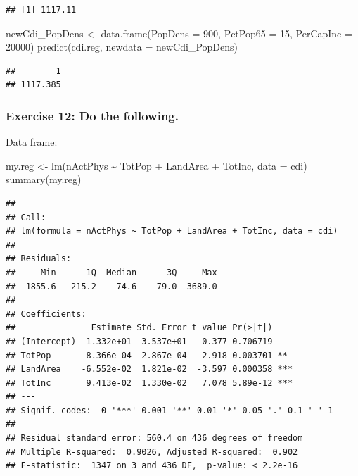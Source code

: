 \documentclass[
]{article}
\newenvironment{Shaded}{\begin{snugshade}}{\end{snugshade}}
\newcommand{\AttributeTok}[1]{\textcolor[rgb]{0.77,0.63,0.00}{#1}}
\newcommand{\DecValTok}[1]{\textcolor[rgb]{0.00,0.00,0.81}{#1}}
\newcommand{\FunctionTok}[1]{\textcolor[rgb]{0.00,0.00,0.00}{#1}}
\newcommand{\NormalTok}[1]{#1}
\newcommand{\OtherTok}[1]{\textcolor[rgb]{0.56,0.35,0.01}{#1}}
\newcommand{\SpecialCharTok}[1]{\textcolor[rgb]{0.00,0.00,0.00}{#1}}
\begin{document}
\begin{verbatim}
## [1] 1117.11
\end{verbatim}

\begin{Shaded}
\begin{Highlighting}[]
\NormalTok{newCdi\_PopDens }\OtherTok{\textless{}{-}} \FunctionTok{data.frame}\NormalTok{(}\AttributeTok{PopDens =} \DecValTok{900}\NormalTok{,}
                             \AttributeTok{PctPop65 =} \DecValTok{15}\NormalTok{,}
                             \AttributeTok{PerCapInc =} \DecValTok{20000}\NormalTok{)}
\FunctionTok{predict}\NormalTok{(cdi.reg, }\AttributeTok{newdata =}\NormalTok{ newCdi\_PopDens)}
\end{Highlighting}
\end{Shaded}

\begin{verbatim}
##        1 
## 1117.385
\end{verbatim}

\hypertarget{exercise-12-do-the-following.}{%
\subsubsection{Exercise 12: Do the
following.}\label{exercise-12-do-the-following.}}

\hfill\break
Data frame:

\begin{Shaded}
\begin{Highlighting}[]
\NormalTok{my.reg }\OtherTok{\textless{}{-}} \FunctionTok{lm}\NormalTok{(nActPhys }\SpecialCharTok{\textasciitilde{}}\NormalTok{ TotPop }\SpecialCharTok{+}\NormalTok{ LandArea }\SpecialCharTok{+}\NormalTok{ TotInc, }\AttributeTok{data =}\NormalTok{ cdi)}
\FunctionTok{summary}\NormalTok{(my.reg)}
\end{Highlighting}
\end{Shaded}

\begin{verbatim}
## 
## Call:
## lm(formula = nActPhys ~ TotPop + LandArea + TotInc, data = cdi)
## 
## Residuals:
##     Min      1Q  Median      3Q     Max 
## -1855.6  -215.2   -74.6    79.0  3689.0 
## 
## Coefficients:
##               Estimate Std. Error t value Pr(>|t|)    
## (Intercept) -1.332e+01  3.537e+01  -0.377 0.706719    
## TotPop       8.366e-04  2.867e-04   2.918 0.003701 ** 
## LandArea    -6.552e-02  1.821e-02  -3.597 0.000358 ***
## TotInc       9.413e-02  1.330e-02   7.078 5.89e-12 ***
## ---
## Signif. codes:  0 '***' 0.001 '**' 0.01 '*' 0.05 '.' 0.1 ' ' 1
## 
## Residual standard error: 560.4 on 436 degrees of freedom
## Multiple R-squared:  0.9026, Adjusted R-squared:  0.902 
## F-statistic:  1347 on 3 and 436 DF,  p-value: < 2.2e-16
\end{verbatim}
\end{document}
